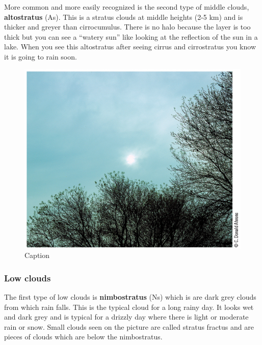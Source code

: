 \documentclass[12pt,oneside]{book}
\begin{document}
More common and more easily recognized is the second type of middle
clouds, \textbf{altostratus} (As). This is a stratus clouds at middle
heights (2-5 km) and is thicker and greyer than cirrocumulus. There is
no halo because the layer is too thick but you can see a ``watery sun''
like looking at the reflection of the sun in a lake. When you see this
altostratus after seeing cirrus and cirrostratus you know it is going to
rain soon.

\begin{figure}

{\centering \includegraphics[width=0.8\linewidth]{figures/Figure250} 

}

\caption{Caption}\label{fig:CLOUD5}
\end{figure}

\subsubsection{Low clouds}\label{low-clouds}

The first type of low clouds is \textbf{nimbostratus} (Ns) which is are
dark grey clouds from which rain falls. This is the typical cloud for a
long rainy day. It looks wet and dark grey and is typical for a drizzly
day where there is light or moderate rain or snow. Small clouds seen on
the picture are called stratus fractus and are pieces of clouds which
are below the nimbostratus.
\end{document}
